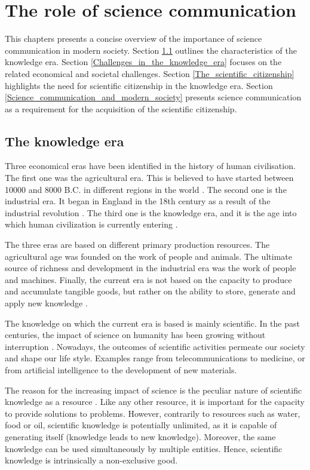\chapter{The role of science communication} \label{The_role_of_science_communication}
This chapters presents a concise overview of the importance of science communication in modern society. Section \ref{The_knowledge_era} outlines the characteristics of the knowledge era. Section \ref{Challenges_in_the_knowledge_era} focuses on the related economical and societal challenges. Section \ref{The_scientific_citizenship} highlights the need for scientific citizenship in the knowledge era. Section \ref{Science_communication_and_modern_society} presents science communication as a requirement for the acquisition of the scientific citizenship. 

\section{The knowledge era} \label{The_knowledge_era}
Three economical eras have been identified in the history of human civilisation. The first one was the agricultural era. This is believed to have started between 10000 and 8000 B.C. in different regions in the world \cite{Bocquet,Barker}. The second one is the industrial era. It began in England in the 18th century as a result of the industrial revolution \cite{Trinder, Griffin}. The third one is the knowledge era, and it is the age into which human civilization is currently entering \cite{Bohme-Stehr}. 

The three eras are based on different primary production resources. The agricultural age was founded on the work of people and animals. The ultimate source of richness and development in the industrial era was the work of people and machines. Finally, the current era is not based on the capacity to produce and accumulate tangible goods, but rather on the ability to store, generate and apply new knowledge \cite{Powell}.

The knowledge on which the current era is based is mainly scientific. In the past centuries, the impact of science on humanity has been growing without interruption \cite{Pickstone}. Nowadays, the outcomes of scientific activities permeate our society and shape our life style. Examples range from telecommunications to medicine, or from artificial intelligence to the development of new materials.

The reason for the increasing impact of science is the peculiar nature of scientific knowledge as a resource \cite{Probst}. Like any other resource, it is important for the capacity to provide solutions to problems. However, contrarily to resources such as water, food or oil, scientific knowledge is potentially unlimited, as it is capable of generating itself (knowledge leads to new knowledge). Moreover, the same knowledge can be used simultaneously by multiple entities. Hence, scientific knowledge is intrinsically a non-exclusive good.

